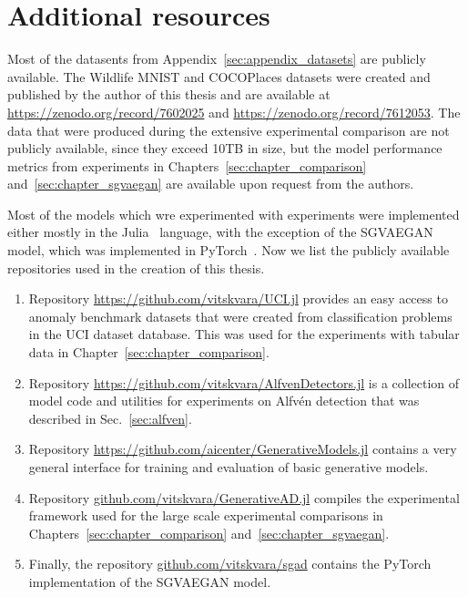 \chapter{Additional resources} \label{sec:appendix_links}

Most of the datasents from Appendix~\ref{sec:appendix_datasets} are publicly available. The Wildlife MNIST and COCOPlaces datasets were created and published by the author of this thesis and are available at \url{https://zenodo.org/record/7602025} and \url{https://zenodo.org/record/7612053}. The data that were produced during the extensive experimental comparison are not publicly available, since they exceed 10TB in size, but the model performance metrics from experiments in Chapters~\ref{sec:chapter_comparison} and~\ref{sec:chapter_sgvaegan} are available upon request from the authors.

Most of the models which wre experimented with experiments were implemented either mostly in the Julia~\cite{Julia-2017} language, with the exception of the SGVAEGAN model, which was implemented in PyTorch~\cite{NEURIPS2019_9015}. Now we list the publicly available repositories used in the creation of this thesis.

\begin{enumerate}
    \item Repository \url{https://github.com/vitskvara/UCI.jl} provides an easy access to anomaly benchmark datasets that were created from classification problems in the UCI dataset database. This was used for the experiments with tabular data in Chapter~\ref{sec:chapter_comparison}.
    \item Repository \url{https://github.com/vitskvara/AlfvenDetectors.jl} is a collection of model code and utilities for experiments on Alfvén detection that was described in Sec.~\ref{sec:alfven}.
    \item Repository \url{https://github.com/aicenter/GenerativeModels.jl} contains a very general interface for training and evaluation of basic generative models.
    \item Repository \url{github.com/vitskvara/GenerativeAD.jl} compiles the experimental framework used for the large scale experimental comparisons in Chapters~\ref{sec:chapter_comparison} and~\ref{sec:chapter_sgvaegan}.
    \item Finally, the repository \url{github.com/vitskvara/sgad} contains the PyTorch implementation of the SGVAEGAN model.
\end{enumerate}

